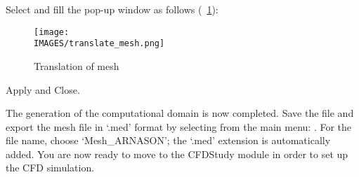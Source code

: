 Select  and fill the pop-up window as follows (\figurename~\ref{lag:translate}):
%
\begin{figure}[H]
	\centering
	\texttt{[image: \\IMAGES/translate\_mesh.png]}
	\caption{Translation of mesh}
	\label{lag:translate}
\end{figure}
%
Apply and Close.

The generation of the computational domain is now completed. Save the \salome file and export the mesh file in ‘.med’ format by selecting from the main menu: . For the file name, choose ‘Mesh\_ARNASON’; the ‘.med’ extension is automatically added.  You are now ready to move to the CFDStudy module in order to set up the CFD simulation.
